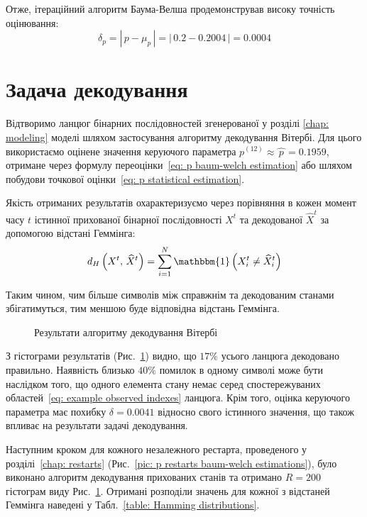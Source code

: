 Отже, ітераційний алгоритм Баума-Велша продемонстрував високу точність оцінювання:
\begin{equation}\label{eq: p accuracy}
    \delta_p = \left|\, p-\mu_p\, \right| = \left|\, 0.2-0.2004\, \right| = 0.0004
\end{equation}

\section{Задача декодування}
\label{chap: decoding}

Відтворимо ланцюг бінарних послідовностей згенерованої у розділі \ref{chap: modeling} моделі шляхом застосування алгоритму декодування Вітербі. Для цього використаємо оцінене значення керуючого параметра $p^{(12)} \approx \widehat{\,p\,}=0.1959$, отримане через формулу переоцінки~\eqref{eq: p baum-welch estimation} або шляхом побудови точкової оцінки~\eqref{eq: p statistical estimation}. 

Якість отриманих результатів охарактеризуємо через порівняння в кожен момент часу $t$ істинної прихованої бінарної послідовності $X^t$ та декодованої $\widehat{X}^t$ за допомогою відстані Геммінга:
\begin{equation*}
    d_H\left( X^t,\,\widehat{X}^t \right) = \sum_{i=1}^{N} \mathbbm{1}\left( X^t_i \neq \widehat{X}^t_i \right)
\end{equation*} 

Таким чином, чим більше символів між справжнім та декодованим станами збігатимуться, тим меншою буде відповідна відстань Геммінга. 

\begin{figure}[H]\centering
    \setfontsize{14pt}
    
    \caption{Результати алгоритму декодування Вітербі}
    \label{pic: viterbi decoding algorithm}
\end{figure}

З гістограми результатів (Рис.~\ref{pic: viterbi decoding algorithm}) видно, що $17\%$ усього ланцюга декодовано правильно. Наявність близько $40\%$ помилок в одному символі може бути наслідком того, що одного елемента стану немає серед спостережуваних областей~\eqref{eq: example observed indexes} ланцюга. Крім того, оцінка керуючого параметра має похибку $\delta=0.0041$ відносно свого істинного значення, що також впливає на результати задачі декодування.

Наступним кроком для кожного незалежного рестарта, проведеного у розділі~\ref{chap: restarts} (Рис.~\ref{pic: p restarts baum-welch estimations}), було виконано алгоритм декодування прихованих станів та отримано $R=200$ гістограм виду Рис.~\ref{pic: viterbi decoding algorithm}. Отримані розподіли значень для кожної з відстаней Геммінга наведені у Табл.~\ref{table: Hamming distributions}.


